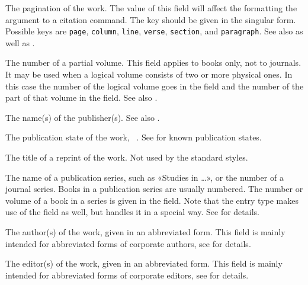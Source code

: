 \documentclass{ltxdockit}[2011/03/25]
\begin{document}
\begin{fieldlist}

The pagination of the work. The value of this field will affect the formatting the  argument to a citation command. The key should be given in the singular form. Possible keys are \texttt{page}, \texttt{column}, \texttt{line}, \texttt{verse}, \texttt{section}, and \texttt{paragraph}. See also  as well as .


The number of a partial volume. This field applies to books only, not to journals. It may be used when a logical volume consists of two or more physical ones. In this case the number of the logical volume goes in the  field and the number of the part of that volume in the  field. See also .


The name(s) of the publisher(s). See also .


The publication state of the work, \eg\ <in press>. See  for known publication states.


\BibTeXOnlyMark The title of a reprint of the work. Not used by the standard styles.


The name of a publication series, such as «Studies in \dots», or the number of a journal series. Books in a publication series are usually numbered. The number or volume of a book in a series is given in the  field. Note that the  entry type makes use of the  field as well, but handles it in a special way. See  for details.


The author(s) of the work, given in an abbreviated form. This field is mainly intended for abbreviated forms of corporate authors, see  for details.


The editor(s) of the work, given in an abbreviated form. This field is mainly intended for abbreviated forms of corporate editors, see  for details.


\end{fieldlist}
\end{document}
